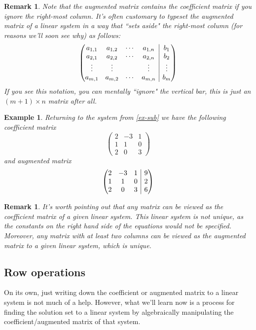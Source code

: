 \documentclass[12pt]{article}
\makeatletter
\numberwithin{equation}{subsection}
\numberwithin{figure}{subsection}
\theoremstyle{note}
\newtheorem{example}[subsection]{Example}
\newtheorem{remark}[subsection]{Remark}
\newenvironment{amatrix}[1]{%
  \left(\begin{array}{@{}*{#1}{c}|c@{}}
}{%
  \end{array}\right)
}
\makeatother
\begin{document}
\begin{remark}Note that the augmented matrix contains the coefficient matrix if you ignore the right-most column. It's often customary to typeset the augmented matrix of a linear system in a way that ``sets aside" the right-most column (for reasons we'll soon see why) as follows:
\begin{equation}\begin{amatrix}{4} a_{1,1} & a_{1,2} & \cdots & a_{1,n} & b_1 \\
a_{2,1} & a_{2,2} & \cdots & a_{2,n} & b_2\\
\vdots & \vdots & & \vdots & \vdots \\
a_{m,1} & a_{m,2} &\cdots & a_{m,n} & b_m
\end{amatrix}\end{equation}
If you see this notation, you can mentally ``ignore" the vertical bar, this is just an $(m+1)\times n$ matrix after all. 
\end{remark}


\begin{example} Returning to the system from \eqref{ex-sub} we have the following coefficient matrix
\[ \begin{pmatrix} 2 & -3 & 1 \\ 1 & 1 & 0 \\ 2 & 0 & 3\end{pmatrix} \]
and augmented matrix \[ \begin{amatrix}{3}  2 & -3 & 1 & 9 \\ 1 & 1 & 0 & 2 \\ 2 & 0 & 3 & 6 \end{amatrix}\]
\end{example}

\begin{remark}It's worth pointing out that any matrix can be viewed as the coefficient matrix of a given linear system. This linear system is not unique, as the constants on the right hand side of the equations would not be specified. Moreover, any matrix with at least two columns can be viewed as the \textit{augmented} matrix to a given linear system, which is unique. 
\end{remark}

\subsection{Row operations}
On its own, just writing down the coefficient or augmented matrix to a linear system is not much of a help. However, what we'll learn now is a process for finding the solution set to a linear system by algebraically manipulating the coefficient/augmented matrix of that system. 
\end{document}
